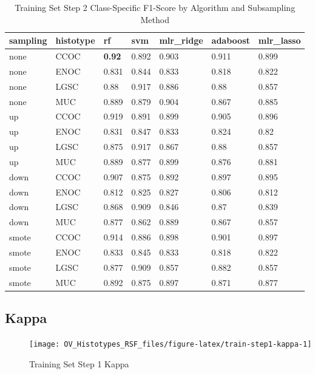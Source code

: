 \documentclass[
]{report}
\begin{document}
\begin{table}

\caption{\label{tab:train-step2-f1-class-table}Training Set Step 2 Class-Specific F1-Score by Algorithm and Subsampling Method}
\centering
\begin{tabular}[t]{l|l|l|l|l|l|l}
\hline
sampling & histotype & rf & svm & mlr\_ridge & adaboost & mlr\_lasso\\
\hline
none & CCOC & \textbf{0.92} & 0.892 & 0.903 & 0.911 & 0.899\\
\hline
none & ENOC & 0.831 & 0.844 & 0.833 & 0.818 & 0.822\\
\hline
none & LGSC & 0.88 & 0.917 & 0.886 & 0.88 & 0.857\\
\hline
none & MUC & 0.889 & 0.879 & 0.904 & 0.867 & 0.885\\
\hline
up & CCOC & 0.919 & 0.891 & 0.899 & 0.905 & 0.896\\
\hline
up & ENOC & 0.831 & 0.847 & 0.833 & 0.824 & 0.82\\
\hline
up & LGSC & 0.875 & 0.917 & 0.867 & 0.88 & 0.857\\
\hline
up & MUC & 0.889 & 0.877 & 0.899 & 0.876 & 0.881\\
\hline
down & CCOC & 0.907 & 0.875 & 0.892 & 0.897 & 0.895\\
\hline
down & ENOC & 0.812 & 0.825 & 0.827 & 0.806 & 0.812\\
\hline
down & LGSC & 0.868 & 0.909 & 0.846 & 0.87 & 0.839\\
\hline
down & MUC & 0.877 & 0.862 & 0.889 & 0.867 & 0.857\\
\hline
smote & CCOC & 0.914 & 0.886 & 0.898 & 0.901 & 0.897\\
\hline
smote & ENOC & 0.833 & 0.845 & 0.833 & 0.818 & 0.822\\
\hline
smote & LGSC & 0.877 & 0.909 & 0.857 & 0.882 & 0.857\\
\hline
smote & MUC & 0.892 & 0.875 & 0.897 & 0.871 & 0.877\\
\hline
\end{tabular}
\end{table}

\hypertarget{kappa-1}{%
\subsection{Kappa}\label{kappa-1}}

\begin{figure}[H]

{\centering \texttt{[image: OV\_Histotypes\_RSF\_files/figure-latex/train-step1-kappa-1]} 

}

\caption{Training Set Step 1 Kappa}\label{fig:train-step1-kappa}
\end{figure}
\end{document}
